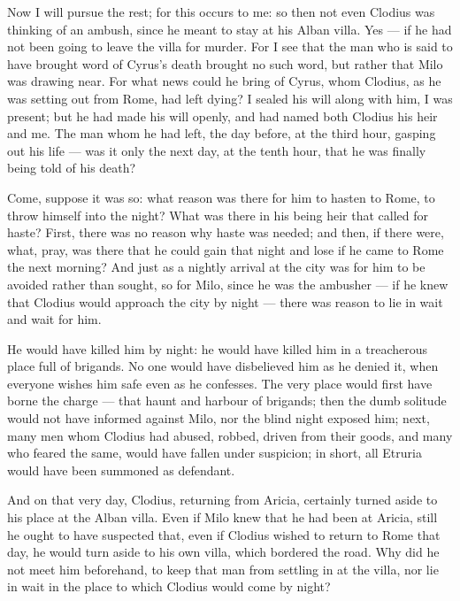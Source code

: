  Now I will pursue the rest; for this occurs to me: so then not even Clodius was thinking of an ambush, since he meant to stay at his Alban villa. Yes --- if he had not been going to leave the villa for murder. For I see that the man who is said to have brought word of Cyrus's death brought no such word, but rather that Milo was drawing near. For what news could he bring of Cyrus, whom Clodius, as he was setting out from Rome, had left dying? I sealed his will along with him, I was present; but he had made his will openly, and had named both Clodius his heir and me. The man whom he had left, the day before, at the third hour, gasping out his life --- was it only the next day, at the tenth hour, that he was finally being told of his death?

 Come, suppose it was so: what reason was there for him to hasten to Rome, to throw himself into the night? What was there in his being heir that called for haste? First, there was no reason why haste was needed; and then, if there were, what, pray, was there that he could gain that night and lose if he came to Rome the next morning? And just as a nightly arrival at the city was for him to be avoided rather than sought, so for Milo, since he was the ambusher --- if he knew that Clodius would approach the city by night --- there was reason to lie in wait and wait for him.

 He would have killed him by night: he would have killed him in a treacherous place full of brigands. No one would have disbelieved him as he denied it, when everyone wishes him safe even as he confesses. The very place would first have borne the charge --- that haunt and harbour of brigands; then the dumb solitude would not have informed against Milo, nor the blind night exposed him; next, many men whom Clodius had abused, robbed, driven from their goods, and many who feared the same, would have fallen under suspicion; in short, all Etruria would have been summoned as defendant.

 And on that very day, Clodius, returning from Aricia, certainly turned aside to his place at the Alban villa. Even if Milo knew that he had been at Aricia, still he ought to have suspected that, even if Clodius wished to return to Rome that day, he would turn aside to his own villa, which bordered the road. Why did he not meet him beforehand, to keep that man from settling in at the villa, nor lie in wait in the place to which Clodius would come by night?

